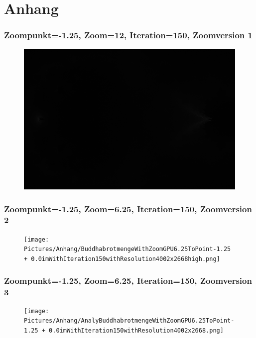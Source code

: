 \section{Anhang}

\subsubsection*{Zoompunkt=-1.25, Zoom=12, Iteration=150, Zoomversion 1}
\begin{figure}[H]
    \centering
    \includegraphics[width=\textwidth]{Pictures/Anhang/BuddhabrotmengeWithZoom12ToPoint-1.25 + 0.0imWithIteration150withResolution4000x2667.png}
    \label{fig:Version1}
\end{figure}
\bigskip
\subsubsection*{Zoompunkt=-1.25, Zoom=6.25, Iteration=150, Zoomversion 2}
\begin{figure}[H]
    \centering
    \texttt{[image: Pictures/Anhang/BuddhabrotmengeWithZoomGPU6.25ToPoint-1.25 + 0.0imWithIteration150withResolution4002x2668high.png]}
    \label{fig:Version2}
\end{figure}
\bigskip
\subsubsection*{Zoompunkt=-1.25, Zoom=6.25, Iteration=150, Zoomversion 3}
\begin{figure}[H]
    \centering
    \texttt{[image: Pictures/Anhang/AnalyBuddhabrotmengeWithZoomGPU6.25ToPoint-1.25 + 0.0imWithIteration150withResolution4002x2668.png]}
    \label{fig:Version3}
\end{figure}
\bigskip
